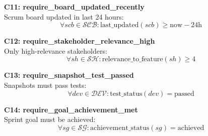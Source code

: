 \documentclass[12pt]{article}
\begin{document}
    \item \textbf{C11: require\_board\_updated\_recently} \\
    Scrum board updated in last 24 hours:
    \[
    \forall scb \in \mathcal{SCB}: \text{last\_updated}(scb) \geq \text{now} - 24\text{h}
    \]

    \item \textbf{C12: require\_stakeholder\_relevance\_high} \\
    Only high-relevance stakeholders:
    \[
    \forall sh \in \mathcal{SH}: \text{relevance\_to\_feature}(sh) \geq 4
    \]

    \item \textbf{C13: require\_snapshot\_test\_passed} \\
    Snapshots must pass tests:
    \[
    \forall dev \in \mathcal{DEV}: \text{test\_status}(dev) = \text{passed}
    \]

    \item \textbf{C14: require\_goal\_achievement\_met} \\
    Sprint goal must be achieved:
    \[
    \forall sg \in \mathcal{SG}: \text{achievement\_status}(sg) = \text{achieved}
    \]
\end{document}
